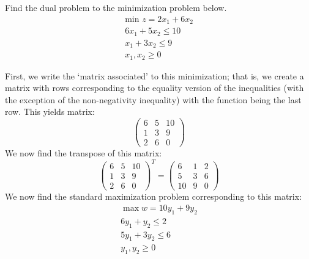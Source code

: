 \documentclass[11pt,letterpaper]{article}
\begin{document}
\newpage



 Find the dual problem to the minimization problem below. 
	\[
	\begin{gathered}
	\text{min } z= 2x_1 + 6x_2 \\
	6x_1 + 5x_2 \leq 10 \\
	x_1 + 3x_2 \leq 9 \\ 
	x_1, x_2 \geq 0
	\end{gathered}
	\] \pspace

\sol First, we write the `matrix associated' to this minimization; that is, we create a matrix with rows corresponding to the equality version of the inequalities (with the exception of the non-negativity inequality) with the function being the last row. This yields matrix:
	\[
	\begin{pmatrix}
	6 & 5 & 10 \\
	1 & 3 & 9 \\
	2 & 6 & 0 
	\end{pmatrix}
	\]
We now find the transpose of this matrix: 
	\[
	\begin{pmatrix}
	6 & 5 & 10 \\
	1 & 3 & 9 \\
	2 & 6 & 0 
	\end{pmatrix}^T= 
	\begin{pmatrix}
	6 & 1 & 2 \\
	5 & 3 & 6 \\
	10 & 9 & 0 
	\end{pmatrix}
	\]
We now find the standard maximization problem corresponding to this matrix:
	\[
	\begin{gathered}
	\max w= 10y_1 + 9y_2 \\
	6y_1 + y_2 \leq 2 \\
	5y_1 + 3y_2 \leq 6 \\
	y_1, y_2 \geq 0
	\end{gathered}
	\]
\end{document}
